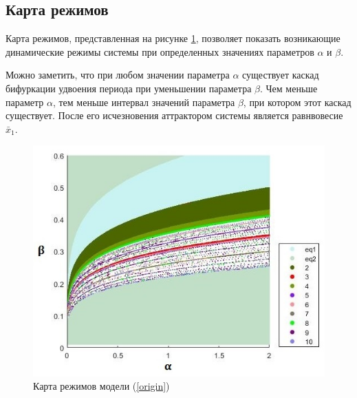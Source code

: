 \subsection{Карта режимов}

    Карта режимов, представленная на рисунке \ref{regimeMap}, позволяет показать возникающие динамические режимы системы при определенных значениях параметров \(\alpha\) и \(\beta\).

    Можно заметить, что при любом значении параметра \(\alpha\) существует каскад бифуркации удвоения периода при уменьшении параметра \(\beta\). Чем меньше параметр \(\alpha\), тем меньше интервал значений параметра \(\beta\), при котором этот каскад существует. После его исчезновения аттрактором системы является равнвовесие \(\bar{x}_1\).

    \begin{figure}
        \centering
        \includegraphics[width=\textwidth]{deterministic/images/regime_map.jpg}

        \captionsetup{justification=centering}
        \caption{Карта режимов модели (\ref{origin})}
        \label{regimeMap}
    \end{figure}
